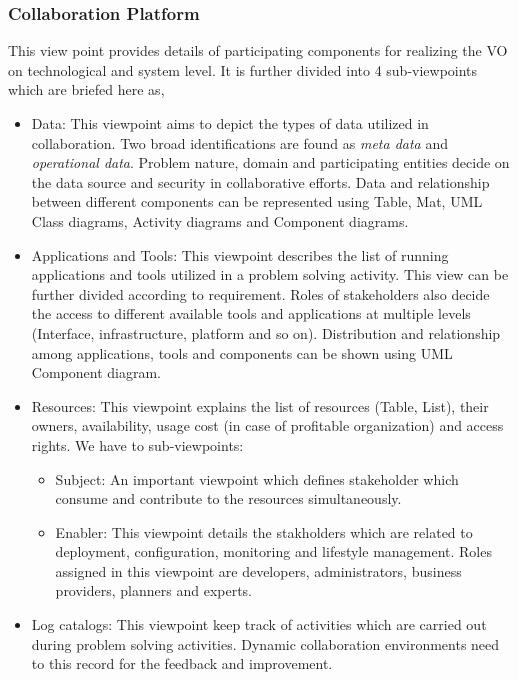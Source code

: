 \documentclass[]{article}
\begin{document}
\subsubsection{Collaboration Platform } This view point provides details of participating components for realizing the VO on technological and system level. It is further divided into 4 sub-viewpoints which are briefed here as,
\begin{itemize}
\item Data: This viewpoint aims to depict the types of data utilized in collaboration. Two broad identifications are found as \emph{meta data} and \emph{operational data}. Problem nature, domain and participating entities decide on the data source and security in collaborative efforts. Data and relationship between different components can be represented using  Table, Mat, UML Class diagrams, Activity diagrams and Component diagrams.
\item Applications and Tools: This viewpoint describes the list of running applications and tools utilized in a problem solving activity. This view can be further divided according to requirement.  Roles of stakeholders also decide the access to different available tools and applications at multiple levels (Interface, infrastructure, platform and so on). Distribution and relationship among applications, tools and components can be shown using UML Component diagram.
\item Resources: This viewpoint explains the list of resources (Table, List), their owners, availability, usage cost (in case of profitable organization) and access rights. We have to sub-viewpoints:
    \begin{itemize}
    \item Subject: An important viewpoint which defines stakeholder which consume and contribute to the resources simultaneously.
    \item Enabler: This viewpoint details the stakholders which are related to deployment, configuration, monitoring and lifestyle management. Roles assigned in this viewpoint are developers, administrators, business providers, planners and experts.
\end{itemize}
\item Log catalogs: This viewpoint keep track of activities which are carried out during problem solving activities. Dynamic collaboration environments need to this record for the feedback and  improvement.
        \end{itemize}
\end{document}
